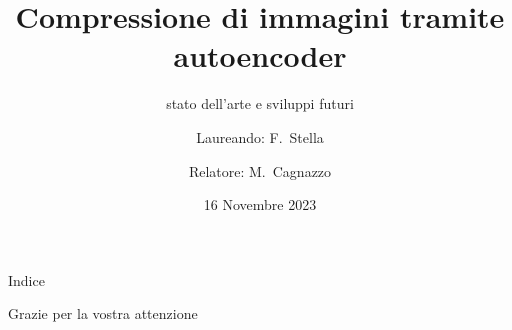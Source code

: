 \documentclass{beamer}
\title{Compressione di immagini tramite autoencoder}
\subtitle{stato dell’arte e sviluppi futuri}
\author[Filippo Stella]{Laureando: F.~Stella \and Relatore: M.~Cagnazzo}
\date{16 Novembre 2023}
\begin{document}
\frame{\titlepage}

\begin{frame}{Indice}
    \tableofcontents    
\end{frame}


    



    
\begin{frame}{\:}
    \begin{center}
        \large Grazie per la vostra attenzione 
    \end{center}
\end{frame}
    
\end{document}

